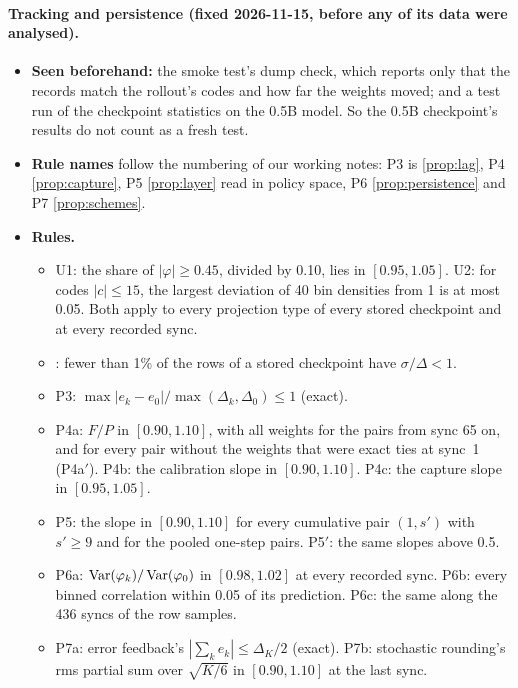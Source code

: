 \paragraph{Tracking and persistence (fixed 2026-11-15, before any of its data were analysed).}
\begin{itemize}[leftmargin=*,itemsep=2pt]
\item \textbf{Seen beforehand:} the smoke test's dump check, which reports only that the records match the rollout's codes and how far the weights moved; and a test run of the checkpoint statistics on the 0.5B model. So the 0.5B checkpoint's results do not count as a fresh test.
\item \textbf{Rule names} follow the numbering of our working notes: P3 is \cref{prop:lag}, P4 \cref{prop:capture}, P5 \cref{prop:layer} read in policy space, P6 \cref{prop:persistence} and P7 \cref{prop:schemes}.
\item \textbf{Rules.}
  \begin{itemize}[leftmargin=*,itemsep=1pt]
  \item U1: the share of $|\varphi|\ge0.45$, divided by 0.10, lies in $[0.95,1.05]$. U2: for codes $|c|\le15$, the largest deviation of 40 bin densities from 1 is at most 0.05. Both apply to every projection type of every stored checkpoint and at every recorded sync.
  \item {}: fewer than 1\% of the rows of a stored checkpoint have $\sigma/\Delta<1$.
  \item P3: $\max|e_k-e_0|/\max(\Delta_k,\Delta_0)\le1$ (exact).
  \item P4a: $F/P$ in $[0.90,1.10]$, with all weights for the pairs from sync 65 on, and for every pair without the weights that were exact ties at sync~1 (P4a$'$). P4b: the calibration slope in $[0.90,1.10]$. P4c: the capture slope in $[0.95,1.05]$.
  \item P5: the slope in $[0.90,1.10]$ for every cumulative pair $(1,s')$ with $s'\ge9$ and for the pooled one-step pairs. P5$'$: the same slopes above 0.5.
  \item P6a: $\operatorname{Var}(\varphi_k)/\operatorname{Var}(\varphi_0)$ in $[0.98,1.02]$ at every recorded sync. P6b: every binned correlation within 0.05 of its prediction. P6c: the same along the 436 syncs of the row samples.
  \item P7a: error feedback's $|\sum_k e_k|\le\Delta_K/2$ (exact). P7b: stochastic rounding's rms partial sum over $\sqrt{K/6}$ in $[0.90,1.10]$ at the last sync.
  \end{itemize}

\end{itemize}
